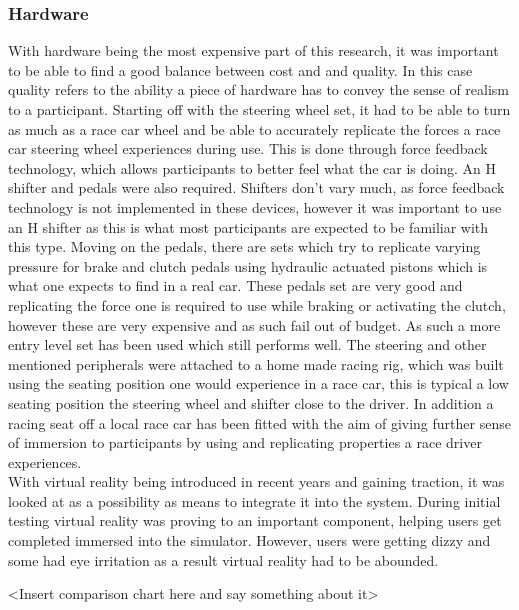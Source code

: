 \subsubsection{Hardware}
With hardware being the most expensive part of this research, it was important to be able to find a good balance between cost and and quality. In this case quality refers to the ability a piece of hardware has to convey the sense of realism to a participant. Starting off with the steering wheel set, it had to be able to turn as much as a race car wheel and be able to accurately replicate the forces a race car steering wheel experiences during use. This is done through force feedback technology, which allows participants to better feel what the car is doing. An H shifter and pedals were also required. Shifters don't vary much, as force feedback technology is not implemented in these devices, however it was important to use an H shifter as this is what most participants are expected to be familiar with this type. Moving on the pedals, there are sets which try to replicate varying pressure for brake and clutch pedals using hydraulic actuated pistons which is what one expects to find in a real car. These pedals set are very good and replicating the force one is required to use while braking or activating the clutch, however these are very expensive and as such fail out of budget. As such a more entry level set has been used which still performs well.
The steering and other mentioned peripherals were attached to a home made racing rig, which was built using the seating position one would experience in a race car, this is typical a low seating position the steering wheel and shifter close to the driver. In addition a racing seat off a local race car has been fitted with the aim of giving further sense of immersion to participants by using and replicating properties a race driver experiences.\\
With virtual reality being introduced in recent years and gaining traction, it was looked at as a possibility as means to integrate it into the system. During initial testing virtual reality was proving to an important component, helping users get completed immersed into the simulator. However, users were getting dizzy and some had eye irritation as a result virtual reality had to be abounded.

<Insert comparison chart here and say something about it>

